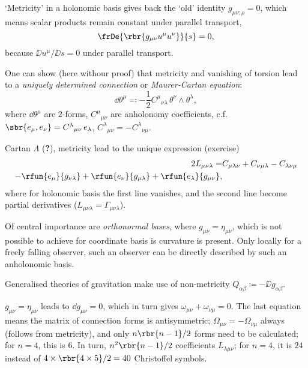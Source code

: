 `Metricity' in a holonomic basis gives back the `old' identity
$g_{\mu\nu;\rho} = 0$, which means scalar products remain constant under
parallel transport,
\begin{equation}
\frDe{\rbr{g_{\mu\nu}u^\mu u^\nu}}{s} = 0,
\end{equation}
because $\DD u^\mu/\DD s = 0$ under parallel transport.

One can show (here withour proof) that metricity and vanishing of torsion lead
to a \emph{uniquely determined connection} or \emph{Maurer-Cartan equation}:
\begin{equation}
\dd \theta^\mu \eqqcolon -\frac{1}{2} C^\mu{}_{\nu\lambda}\,
\theta^\nu\wedge\theta^\lambda,
\end{equation}
where $\dd\theta^\mu$ are $2$-forms, $C^\mu{}_{\mu\nu}$ are anholonomy
coefficients, c.f.\ $\sbr{e_\mu, e_\nu} = C^\lambda{}_{\mu\nu}\, e_\lambda$,
$C^\lambda{}_{\mu\nu} = - C^\lambda{}_{\nu\mu}$.

Cartan $\Lambda$ (\textbf{?}), metricity lead to the unique expression
(exercise)
\begin{equation}
\begin{split}
2 L_{\mu\nu\lambda} =
&C_{\mu\lambda\nu} + C_{\nu\mu\lambda} - C_{\lambda\nu\mu} \\
-\rfun{e_\mu}{g_{\nu\lambda}}+\rfun{e_\nu}{g_{\mu\lambda}}
+\rfun{e_\lambda}{g_{\mu\nu}},
\end{split}
\end{equation}
where for holonomic basis the first line vanishes, and the second line become
partial derivatives ($L_{\mu\nu\lambda} = \Gamma_{\mu\nu\lambda}$).

Of central importance are \emph{orthonormal bases}, where
$g_{\mu\nu} = \eta_{\mu\nu}$, which is not possible to achieve for coordinate
basis is  curvature is present. Only locally for a freely falling observer,
such an observer can be directly described by such an anholonomic basis.

\begin{rem}
Generalised theories of gravitation make use of non-metricity $Q_{\alpha\beta}
\coloneq -\DD g_{\alpha\beta}$.
\end{rem}

$g_{\mu\nu}=\eta_{\mu\nu}$ leads to $\dd g_{\mu\nu} = 0$, which in turn
gives $\omega_{\mu\nu} + \omega_{\nu\mu} = 0$. The last equation means the
matrix of connection forms is antisymmetric; $\Omega_{\mu\nu} = -
\Omega_{\nu\mu}$ always (follows from metricity), and only $n\rbr{n-1}/2$
forms need to be calculated; for $n=4$, this is $6$. In turn,
$n^2\rbr{n-1}/2$ coefficients $L_{\lambda\mu\nu}$; for $n=4$, it is $24$
instead of $4\times \rbr{4\times 5}/2 = 40$ Christoffel symbols.


